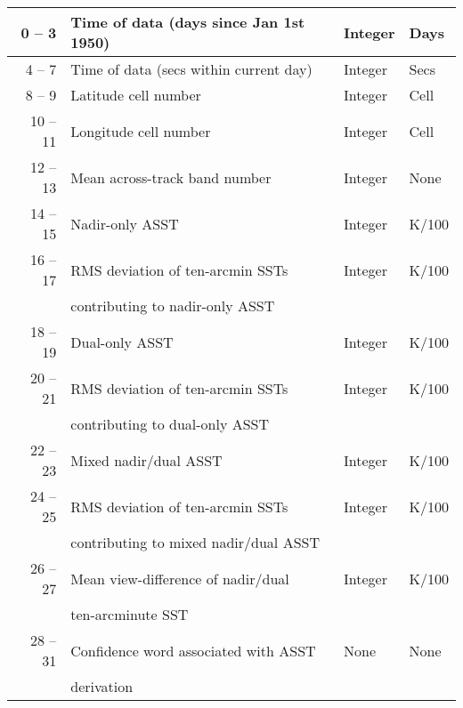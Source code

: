 \begin{table}
\begin{center}
\begin{tabular}{|r|l|l|l|}
0 -- 3   & Time of data (days since Jan 1st 1950)   & Integer & Days  \\ \hline
4 -- 7   & Time of data (secs within current day)   & Integer & Secs  \\ \hline
8 -- 9   & Latitude cell number                     & Integer & Cell  \\ \hline
10 -- 11 & Longitude cell number                    & Integer & Cell  \\ \hline
12 -- 13 & Mean across-track band number            & Integer & None  \\ \hline
14 -- 15 & Nadir-only ASST                          & Integer & K/100 \\ \hline
16 -- 17 & RMS deviation of ten-arcmin SSTs         & Integer & K/100 \\ 
         & contributing to nadir-only ASST          &         &       \\ \hline
18 -- 19 & Dual-only ASST                           & Integer & K/100 \\ \hline
20 -- 21 & RMS deviation of ten-arcmin SSTs         & Integer & K/100 \\
         & contributing to dual-only ASST           &         &       \\ \hline
22 -- 23 & Mixed nadir/dual ASST                    & Integer & K/100 \\ \hline
24 -- 25 & RMS deviation of ten-arcmin SSTs         & Integer & K/100 \\ 
         & contributing to mixed nadir/dual ASST    &         &       \\ \hline
26 -- 27 & Mean view-difference of nadir/dual       & Integer & K/100 \\
         & ten-arcminute SST                        &         &       \\ \hline
28 -- 31 & Confidence word associated with ASST     & None    & None  \\ 
         & derivation                               &         &       \\ \hline
\end{tabular}
\end{center}
\end{table}


